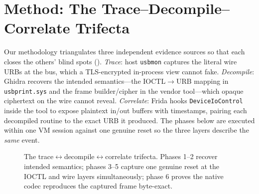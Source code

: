 \documentclass[conference]{IEEEtran}
\begin{document}
\section{Method: The Trace--Decompile--Correlate Trifecta}
\label{sec:method}

Our methodology triangulates three independent evidence sources so that
each closes the others' blind spots (). \emph{Trace}:
host \texttt{usbmon} captures the literal wire URBs at the bus, which a
TLS-encrypted in-process view cannot fake. \emph{Decompile}: Ghidra
recovers the intended semantics---the IOCTL$\rightarrow$URB mapping in
\texttt{usbprint.sys} and the frame builder/cipher in the vendor tool---which
opaque ciphertext on the wire cannot reveal. \emph{Correlate}: Frida hooks
\texttt{DeviceIoControl} inside the tool to expose plaintext in/out buffers
with timestamps, pairing each decompiled routine to the exact URB it
produced. The phases below are executed within one VM session against one
genuine reset so the three layers describe the \emph{same} event.

\begin{figure}[ht]
\centering
{}
\caption{The trace$\leftrightarrow$decompile$\leftrightarrow$correlate
trifecta. Phases 1--2 recover intended semantics; phases 3--5 capture one
genuine reset at the IOCTL and wire layers simultaneously; phase 6 proves
the native codec reproduces the captured frame byte-exact.}
\label{fig:trifecta}
\end{figure}
\end{document}

